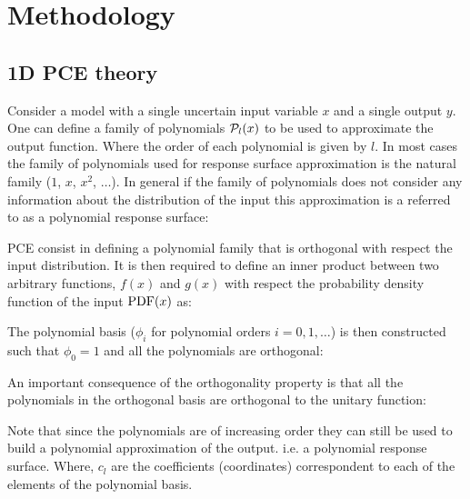 \documentclass[preprint,12pt]{elsarticle}
\begin{document}
\section{Methodology}

\subsection{1D PCE theory}

Consider a model with a single uncertain input variable $x$ and a single output $y$. One can define a family of polynomials $\mathcal{P}_l (x)$ to be used to approximate the output function. Where the order of each polynomial is given by $l$. In most cases the family of polynomials used for response surface approximation is the natural family ($1$, $x$, $x^2$, $\dots$). In general if the family of polynomials does not consider any information about the distribution of the input this approximation is a referred to as a polynomial response surface:


PCE consist in defining a polynomial family that is orthogonal with respect the input distribution. It is then required to define an inner product between two arbitrary functions, $f(x)$ and $g(x)$ with respect the probability density function of the input $\mathrm{PDF}(x)$ as:


The polynomial basis ($\phi_{i}$ for polynomial orders $i=0,1,\dots$) is then constructed such that $\phi_{0}=1$ and all the polynomials are orthogonal:


An important consequence of the orthogonality property is that all the polynomials in the orthogonal basis are orthogonal to the unitary function:


Note that since the polynomials are of increasing order they can still be used to build a polynomial approximation of the output. i.e. a polynomial response surface. Where, $c_l$ are the coefficients (coordinates) correspondent to each of the elements of the polynomial basis.
\end{document}
